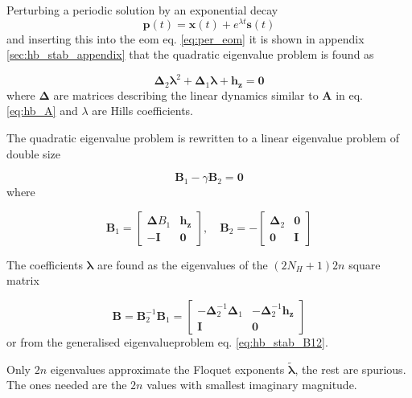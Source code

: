 Perturbing a periodic solution by an exponential decay
\begin{equation}
  \label{eq:hb_pert}
  \bm p(t) = \bm x(t) + e^{\lambda t}\bm s(t)
\end{equation}
and inserting this into the eom eq. \eqref{eq:per_eom} it is shown in appendix
\ref{sec:hb_stab_appendix} that the quadratic eigenvalue problem is found as

\begin{equation}
  \label{eq:hb_quad_eigen}
  \bm \Delta_2 \bm \lambda^2 + \bm \Delta_1 \bm \lambda + \bm h_{\bm z} = \bm 0
\end{equation}
where $\bm \Delta$ are matrices describing the linear dynamics similar to $\bm
A$ in eq. \eqref{eq:hb_A} and $\lambda$ are Hills coefficients.

The quadratic eigenvalue problem is rewritten to a linear eigenvalue problem of
double size

\begin{equation}
  \label{eq:hb_double_eigen}
  \bm B_1 - \gamma \bm B_2 = \bm 0
\end{equation}
where

\begin{equation}
  \label{eq:hb_stab_B12}
  \bm B_1 =
  \begin{bmatrix}
    \bm \Delta B_1 & \bm h_{\bm z} \\
    -\bm{I}    & \bm 0
  \end{bmatrix}, \quad
  \bm B_2 = -
  \begin{bmatrix}
    \bm \Delta_2   & \bm 0 \\
    \bm 0          & \bm{I}
  \end{bmatrix}
\end{equation}

The coefficients $\bm \lambda$ are found as the eigenvalues of the $(2N_H+1)2n$
square matrix

\begin{equation}
  \label{eq:hb_B}
  \bm B = \bm B^{-1}_2 \bm B_1 =
  \begin{bmatrix}
    -\bm \Delta^{-1}_2 \bm\Delta_1 & -\bm \Delta^{-1}_2 \bm h_{\bm z} \\
    \bm{I}                    & \bm 0
  \end{bmatrix}
\end{equation}
or from the generalised eigenvalueproblem eq. \eqref{eq:hb_stab_B12}.

Only $2n$ eigenvalues approximate the Floquet exponents $\tilde{\bm \lambda}$,
the rest are spurious. The ones needed are the $2n$ values with smallest
imaginary magnitude.

